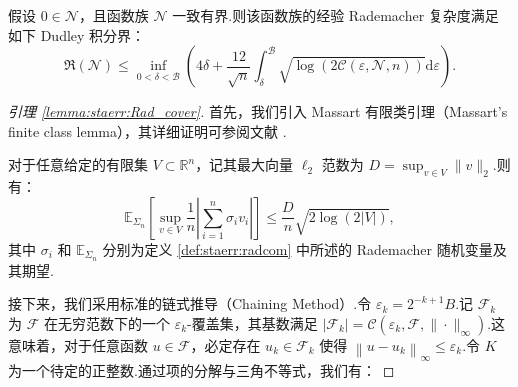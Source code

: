 \begin{lemma}\label{lemma:staerr:Rad_cover}
假设 $0\in \mathcal{N}$，且函数族 $\mathcal{N}$ 一致有界.则该函数族的经验 Rademacher 复杂度满足如下 Dudley 积分界：
$$\mathfrak{R}(\mathcal{N}) \leq  \inf_{0<\delta<\mathcal{B}}\left(4 \delta+\frac{12}{\sqrt{n}} \int_{\delta}^{\mathcal{B}} \sqrt{\log (2\mathcal{C}\left( \varepsilon, \mathcal{N}, n\right))}\mathrm{d}\varepsilon\right).$$
\end{lemma} 
\begin{proof}[引理 \ref{lemma:staerr:Rad_cover}]\label{pf:lemma:staerr:Rad_cover}
首先，我们引入 Massart 有限类引理（Massart's finite class lemma），其详细证明可参阅文献 \cite{boucheron2013concentration}.

\begin{lemma}\label{Mfinite}
对于任意给定的有限集 $V\subset\mathbb{R}^{n}$，记其最大向量 $\ell_2$ 范数为 $D=\sup_{v\in V}\|v\|_{2}$.则有：
$$ \mathbb{E}_{\Sigma_{n}}\left[ \sup_{v\in V}\frac{1}{n}\left| \sum_{i=1}^{n}\sigma_{i}v_{i} \right| \right] \leq \frac{D}{n}\sqrt{2\log(2|V|)}, $$
其中 $\sigma_{i}$ 和 $\mathbb{E}_{\Sigma_{n}}$ 分别为定义 \ref{def:staerr:radcom} 中所述的 Rademacher 随机变量及其期望.
\end{lemma}
接下来，我们采用标准的链式推导（Chaining Method）.令 $\varepsilon_{k}=2^{-k+1} B$.记 $\mathcal{F}_{k}$ 为 $\mathcal{F}$ 在无穷范数下的一个 $\varepsilon_{k}$-覆盖集，其基数满足 $\left|\mathcal{F}_{k}\right|=\mathcal{C}\left(\varepsilon_{k}, \mathcal{F},\|\cdot\|_{\infty}\right)$.这意味着，对于任意函数 $u \in \mathcal{F}$，必定存在 $u_{k} \in \mathcal{F}_{k}$ 使得 $\left\|u-u_{k}\right\|_{\infty} \leq \varepsilon_{k}$.令 $K$ 为一个待定的正整数.通过项的分解与三角不等式，我们有：


\end{proof}

